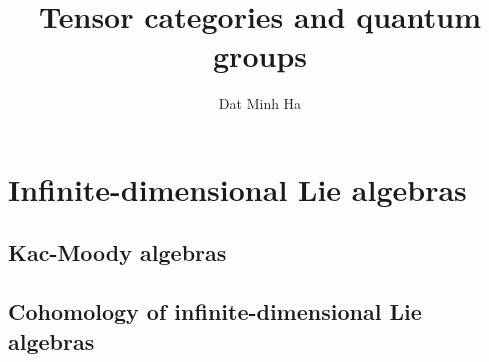 

\setcounter{chapter}{-1}
\setcounter{section}{-1}





    \title{Tensor categories and quantum groups}
    
    \author{Dat Minh Ha}
    \maketitle
    
    \begin{abstract}
        
    \end{abstract}
    
    {
      \hypersetup{} 
      \dominitoc
      \tableofcontents %
      \listoftodos
    }
    
    

    \part{Infinite-dimensional Lie algebras}
        \chapter{Kac-Moody algebras}
            \begin{abstract}
            
            \end{abstract}
            
            \minitoc

            

            

            

        \chapter{Cohomology of infinite-dimensional Lie algebras}
            \begin{abstract}
            
            \end{abstract}
            

